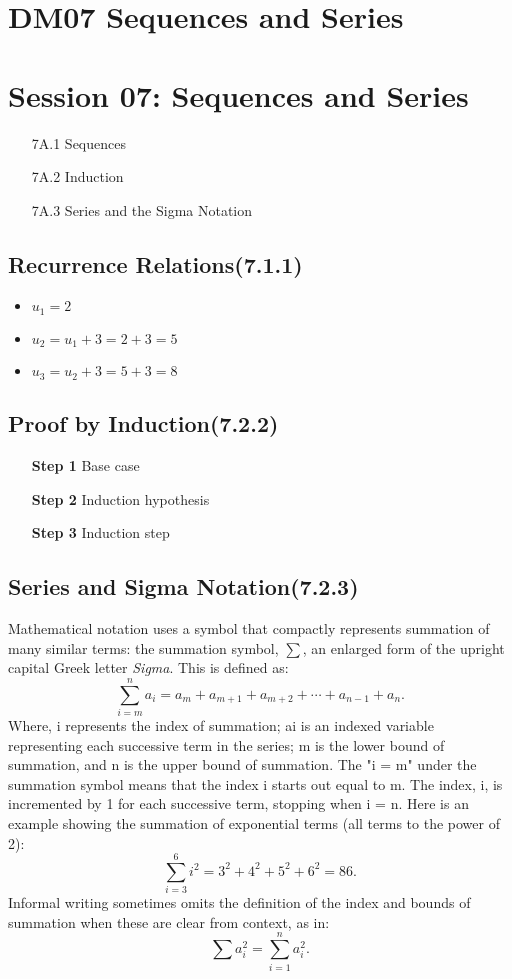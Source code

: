 \documentclass{article}
\begin{document}
\section*{DM07 Sequences and Series}

\section*{Session 07: Sequences and Series}
\begin{itemize}
\item[7A.1] Sequences
\item[7A.2] Induction
\item[7A.3] Series and the Sigma Notation
\end{itemize}

\subsection*{Recurrence Relations(7.1.1)}

\begin{itemize}
\item $u_1 = 2$
\item $u_2 = u_1 + 3 = 2 +3 = 5$
\item $u_3 = u_2 + 3 = 5+ 3 = 8$
\end{itemize}


\subsection*{Proof by Induction(7.2.2)}
\begin{itemize}
\item[\textbf{Step 1}] Base case
\item[\textbf{Step 2}] Induction hypothesis
\item[\textbf{Step 3}] Induction step
\end{itemize}



\subsection*{Series and Sigma Notation(7.2.3)}
Mathematical notation uses a symbol that compactly represents summation of many similar terms: the summation symbol, $\sum$, an enlarged form of the upright capital Greek letter \textit{Sigma}. This is defined as:
\[\sum_{i=m}^n a_i = a_m + a_{m+1} + a_{m+2} +\cdots+ a_{n-1} + a_n. \]
Where, i represents the index of summation; ai is an indexed variable representing each successive term in the series; m is the lower bound of summation, and n is the upper bound of summation. The "i = m" under the summation symbol means that the index i starts out equal to m. The index, i, is incremented by 1 for each successive term, stopping when i = n.
Here is an example showing the summation of exponential terms (all terms to the power of 2):
\[\sum_{i=3}^6 i^2 = 3^2+4^2+5^2+6^2 = 86.\]
Informal writing sometimes omits the definition of the index and bounds of summation when these are clear from context, as in:
\[\sum a_i^2 = \sum_{i=1}^n a_i^2.\]
\end{document}
